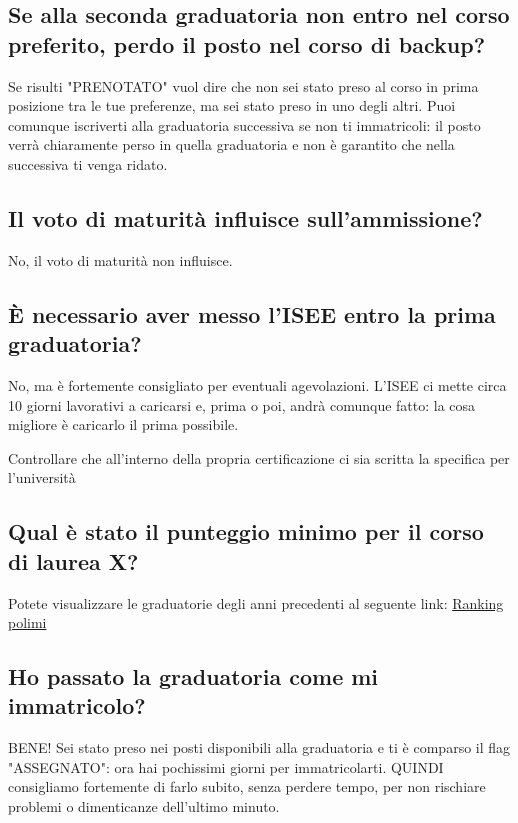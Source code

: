\documentclass[legal]{polinetwork}
\begin{document}
\subsection{Se alla seconda graduatoria non entro nel corso preferito, perdo il posto nel corso di backup?}


Se risulti "PRENOTATO" vuol dire che non sei stato preso al corso in prima posizione tra le tue preferenze, ma sei stato preso in uno degli altri. Puoi comunque iscriverti alla graduatoria successiva se non ti immatricoli: il posto verrà chiaramente perso in quella graduatoria e non è garantito che nella successiva ti venga ridato.

\subsection{Il voto di maturità influisce sull'ammissione?}


No, il voto di maturità non influisce.

\subsection{È necessario aver messo l'ISEE entro la prima graduatoria?}


No, ma è fortemente consigliato per eventuali agevolazioni. L’ISEE ci mette circa 10 giorni lavorativi a caricarsi e, prima o poi, andrà comunque fatto: la cosa migliore è caricarlo il prima possibile.

Controllare che all’interno della propria certificazione ci sia scritta la specifica per l’università

\subsection{Qual è stato il punteggio minimo per il corso di laurea X?}


Potete visualizzare le graduatorie degli anni precedenti al seguente link: \href{https://rankings.polinetwork.org/}{Ranking polimi}

\subsection{Ho passato la graduatoria come mi immatricolo?}


BENE! Sei stato preso nei posti disponibili alla graduatoria e ti è comparso il flag "ASSEGNATO": ora hai pochissimi giorni per immatricolarti. QUINDI consigliamo fortemente di farlo subito, senza perdere tempo, per non rischiare problemi o dimenticanze dell'ultimo minuto.
\end{document}
